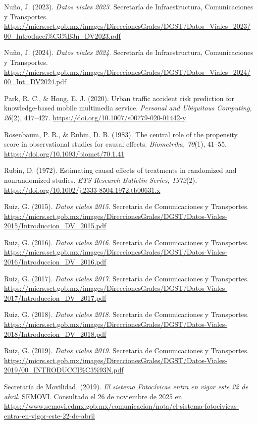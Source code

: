 \begin{thebibliography}{}
Nuño, J. (2023). \textit{Datos viales 2023}. Secretaría de Infraestructura, Comunicaciones y Transportes. \url{https://micrs.sct.gob.mx/images/DireccionesGrales/DGST/Datos_Viales_2023/00_Introducci%C3%B3n_DV2023.pdf}

Nuño, J. (2024). \textit{Datos viales 2024}. Secretaría de Infraestructura, Comunicaciones y Transportes. \url{https://micrs.sct.gob.mx/images/DireccionesGrales/DGST/Datos_Viales_2024/00_Int_DV2024.pdf}

Park, R. C., \& Hong, E. J. (2020). Urban traffic accident risk prediction for knowledge-based mobile multimedia service. \textit{Personal and Ubiquitous Computing, 26}(2), 417–427. \url{https://doi.org/10.1007/s00779-020-01442-y}

Rosenbaum, P. R., \& Rubin, D. B. (1983). The central role of the propensity score in observational studies for causal effects. \textit{Biometrika, 70}(1), 41–55. \url{https://doi.org/10.1093/biomet/70.1.41}

Rubin, D. (1972). Estimating causal effects of treatments in randomized and nonrandomized studies. \textit{ETS Research Bulletin Series, 1972}(2). \url{https://doi.org/10.1002/j.2333-8504.1972.tb00631.x}

Ruiz, G. (2015). \textit{Datos viales 2015}. Secretaría de Comunicaciones y Transportes. \url{https://micrs.sct.gob.mx/images/DireccionesGrales/DGST/Datos-Viales-2015/Introduccion_DV_2015.pdf}

Ruiz, G. (2016). \textit{Datos viales 2016}. Secretaría de Comunicaciones y Transportes. \url{https://micrs.sct.gob.mx/images/DireccionesGrales/DGST/Datos-Viales-2016/Introduccion_DV_2016.pdf}

Ruiz, G. (2017). \textit{Datos viales 2017}. Secretaría de Comunicaciones y Transportes. \url{https://micrs.sct.gob.mx/images/DireccionesGrales/DGST/Datos-Viales-2017/Introduccion_DV_2017.pdf}

Ruiz, G. (2018). \textit{Datos viales 2018}. Secretaría de Comunicaciones y Transportes. \url{https://micrs.sct.gob.mx/images/DireccionesGrales/DGST/Datos-Viales-2018/Introduccion_DV_2018.pdf}

Ruiz, G. (2019). \textit{Datos viales 2019}. Secretaría de Comunicaciones y Transportes. \url{https://micrs.sct.gob.mx/images/DireccionesGrales/DGST/Datos-Viales-2019/00_INTRODUCCI%C3%93N.pdf}

Secretaría de Movilidad. (2019). \textit{El sistema Fotoc\'ivicas entra en vigor este 22 de abril}. SEMOVI. Consultado el 26 de noviembre de 2025 en \url{https://www.semovi.cdmx.gob.mx/comunicacion/nota/el-sistema-fotocivicas-entra-en-vigor-este-22-de-abril}


\end{thebibliography}
